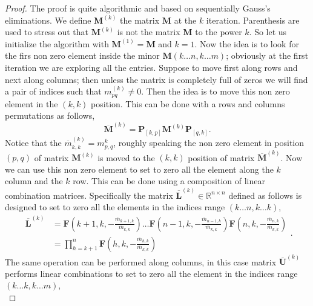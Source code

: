 		\begin{proof}
			The proof is quite algorithmic and based on sequentially Gauss's eliminations. 
			We define $\bm{M}^{(k)}$ the matrix $\bm{M}$ at the $k$ iteration.
			Parenthesis are used to stress out that $\bm{M}^{(k)}$ is not the matrix
			$\bm{M}$ to the power $k$. So let us initialize the algorithm with
			$\bm{M}^{(1)} = \bm{M}$ and $k=1$.
			Now the idea is to look for the firs non zero element inside the minor 
			$\bm{M}(k\dots n, k\dots m)$; obviously at the first iteration we are exploring all the entries.
			Suppose to move first along rows and next along columns; then unless the matrix is
			completely full of zeros we will find a pair of indices such that
			$m^{(k)}_{pq}\neq 0$. Then the idea is to move this non zero element
			in the $(k,k)$ position. This can be done with a rows and columns permutations as follows,
			\begin{equation}
				\overline{\bm{M}}^{(k)} = \bm{P}_{[k,p]}\bm{M}^{(k)}\bm{P}_{[q,k]}.
			\end{equation}
			Notice that the $\overline{m}^{(k)}_{k,k} = m^{k}_{p,q}$, 
			roughly speaking the non zero element in position $(p,q)$ of matrix 
			$\bm{M}^{(k)}$ is moved to the $(k,k)$ position of matrix $\overline{\bm{M}}^{(k)}$.
			Now we can use this non zero element to set to zero all the element along the 
			$k$ column and the $k$ row. This can be done using a composition of linear
			combination matrices.
			Specifically the matrix $\overline{\bm{L}}^{(k)}\in\mathbb{R}^{n\times n}$ defined
			as follows is designed to set to zero all the elements in the indices
			range $(k\dots n, k\dots k)$,
			\begin{equation}
				\begin{split}
					\overline{\bm{L}}^{(k)} &= 
					\bm{F}\left(k+1,k,-\frac{\overline{m}_{k+1,k}}{\overline{m}_{k,k}}\right)
					\dots \bm{F}\left(n-1,k,-\frac{\overline{m}_{n-1,k}}{\overline{m}_{k,k}}\right)
					\bm{F}\left(n,k,-\frac{\overline{m}_{n,k}}{\overline{m}_{k,k}}\right) \\
					&= \prod_{h=k+1}^{n} \bm{F}\left(h,k,-\frac{\overline{m}_{h,k}}{\overline{m}_{k,k}}\right)
				\end{split}.
			\end{equation}
			The same operation can be performed along columns, 
			in this case matrix $\overline{\bm{U}}^{(k)}$ performs linear
			combinations to set to zero all the element in the indices
			range $(k\dots k, k\dots m)$,
			\begin{equation}

\end{equation}
\end{proof}

